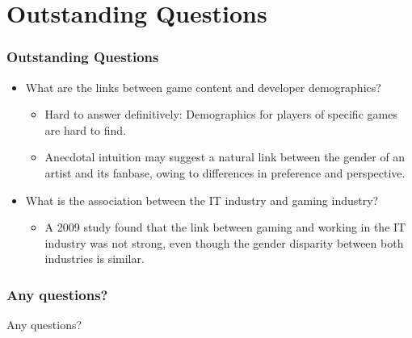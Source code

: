 \documentclass{beamer}
\begin{document}
\section{Outstanding Questions}
\begin{frame}
    \frametitle{Outstanding Questions}
    \begin{itemize}
	    \item What are the links between game content and developer demographics?
	    \begin{itemize}
	        \item Hard to answer definitively: Demographics for players of specific games are hard to find.
	        \item Anecdotal intuition may suggest a natural link between the gender of an artist and its fanbase, owing to differences in preference and perspective.
	    \end{itemize}
	    \item What is the association between the IT industry and gaming industry?
	    \begin{itemize}
	        \item A 2009 study \cite{betsy_questioning_2009} found that the link between gaming and working in the IT industry was not strong, even though the gender disparity between both industries is similar.
        \end{itemize}
    \end{itemize}
\end{frame}

\begin{frame}
\frametitle{Any questions?}
Any questions?
\end{frame}



\end{document}
